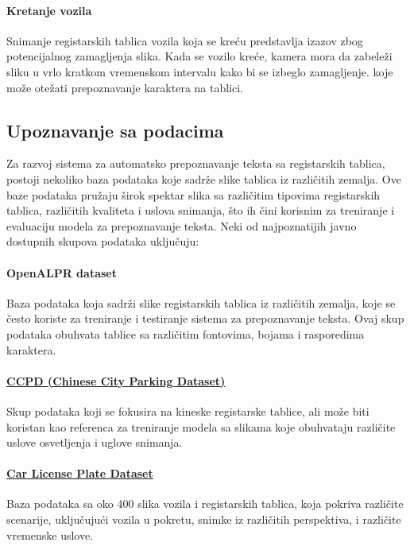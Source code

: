 \documentclass[a4paper,12pt]{article}
\begin{document}
	\paragraph{Kretanje vozila}
	Snimanje registarskih tablica vozila koja se kreću predstavlja izazov zbog potencijalnog zamagljenja slika. Kada se vozilo kreće, kamera mora da zabeleži sliku u vrlo kratkom vremenskom intervalu kako bi se izbeglo zamagljenje. koje može otežati prepoznavanje karaktera na tablici.
	
	\subsection{Upoznavanje sa podacima}
	Za razvoj sistema za automatsko prepoznavanje teksta sa registarskih tablica, postoji nekoliko baza podataka koje sadrže slike tablica iz različitih zemalja. Ove baze podataka pružaju širok spektar slika sa različitim tipovima registarskih tablica, različitih kvaliteta i uslova snimanja, što ih čini korisnim za treniranje i evaluaciju modela za prepoznavanje teksta. Neki od najpoznatijih javno dostupnih skupova podataka uključuju:
		
	\paragraph{OpenALPR dataset}
	Baza podataka koja sadrži slike registarskih tablica iz različitih zemalja, koje se često koriste za treniranje i testiranje sistema za prepoznavanje teksta. Ovaj skup podataka obuhvata tablice sa različitim fontovima, bojama i rasporedima karaktera.
	
	\paragraph{\href{https://github.com/detectRecog/CCPD}{CCPD (Chinese City Parking Dataset)}}
	Skup podataka koji se fokusira na kineske registarske tablice, ali može biti koristan kao referenca za treniranje modela sa slikama koje obuhvataju različite uslove osvetljenja i uglove snimanja.
	
	\paragraph{\href{https://datasetninja.com/car-license-plate}{Car License Plate Dataset}}
	Baza podataka sa oko 400 slika vozila i registarskih tablica, koja pokriva različite scenarije, uključujući vozila u pokretu, snimke iz različitih perspektiva, i različite vremenske uslove. \newline
	
\end{document}
